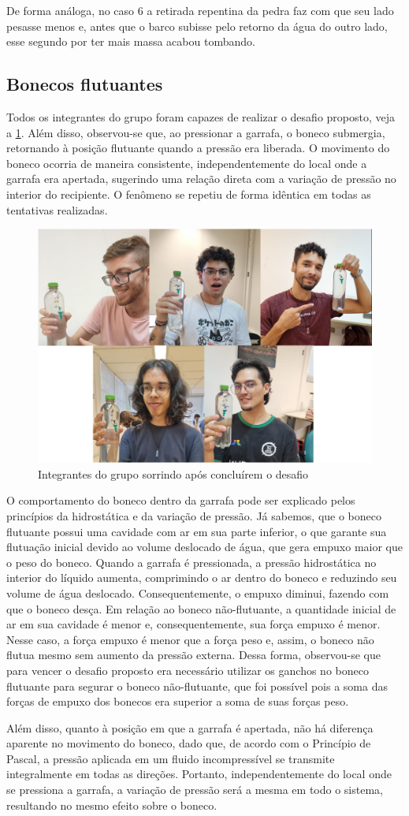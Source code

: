 De forma análoga, no caso 6 a retirada repentina da pedra faz com que seu lado pesasse menos e, antes que o barco subisse pelo retorno da água do outro lado, esse segundo por ter mais massa acabou tombando.

\subsection{Bonecos flutuantes}

Todos os integrantes do grupo foram capazes de realizar o desafio proposto, veja
a \cref{figdesafio}. Além disso, observou-se que, ao pressionar a garrafa, o
boneco submergia, retornando à posição flutuante quando a pressão era liberada.
O movimento do boneco ocorria de maneira consistente, independentemente do local
onde a garrafa era apertada, sugerindo uma relação direta com a variação de
pressão no interior do recipiente. O fenômeno se repetiu de forma idêntica em
todas as tentativas realizadas.

\begin{figure}[H]
    \centering
    \includegraphics[width=.5\linewidth]{fig/desafio.png}
    \caption{Integrantes do grupo sorrindo após concluírem o desafio}
    \label{figdesafio}
\end{figure}

O comportamento do boneco dentro da garrafa pode ser explicado pelos princípios
da hidrostática e da variação de pressão. Já sabemos, que o boneco flutuante possui uma
cavidade com ar em sua parte inferior, o que garante sua flutuação inicial
devido ao volume deslocado de água, que gera empuxo maior que o peso do boneco.
Quando a garrafa é pressionada, a pressão hidrostática no interior do líquido
aumenta, comprimindo o ar dentro do boneco e reduzindo seu volume de água
deslocado. Consequentemente, o empuxo diminui, fazendo com que o boneco desça.
Em relação ao boneco não-flutuante, a quantidade inicial de ar em sua cavidade
é menor e, consequentemente, sua força empuxo é menor. Nesse caso, a força
empuxo é menor que a força peso e, assim, o boneco não flutua mesmo sem aumento
da pressão externa. Dessa forma, observou-se que para vencer o desafio
proposto era necessário utilizar os ganchos no boneco flutuante para segurar o
boneco não-flutuante, que foi possível pois a soma das forças de empuxo dos
bonecos era superior a soma de suas forças peso.

Além disso, quanto à posição em que a garrafa é apertada, não há diferença
aparente no movimento do boneco, dado que, de acordo com o Princípio de Pascal,
a pressão aplicada em um fluido incompressível se transmite integralmente em
todas as direções. Portanto, independentemente do local onde se pressiona a
garrafa, a variação de pressão será a mesma em todo o sistema, resultando no
mesmo efeito sobre o boneco.

